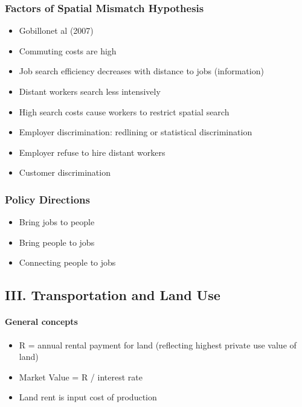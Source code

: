 \documentclass[]{article}
\providecommand{\tightlist}{%
  \setlength{\itemsep}{0pt}\setlength{\parskip}{0pt}}
\let\oldparagraph\paragraph
\renewcommand{\paragraph}[1]{\oldparagraph{#1}\mbox{}}
\begin{document}
\hypertarget{factors-of-spatial-mismatch-hypothesis}{%
\subsubsection{Factors of Spatial Mismatch
Hypothesis}\label{factors-of-spatial-mismatch-hypothesis}}

\begin{itemize}
\tightlist
\item
  Gobillonet al (2007)
\item
  Commuting costs are high
\item
  Job search efficiency decreases with distance to jobs (information)
\item
  Distant workers search less intensively
\item
  High search costs cause workers to restrict spatial search
\item
  Employer discrimination: redlining or statistical discrimination
\item
  Employer refuse to hire distant workers
\item
  Customer discrimination
\end{itemize}

\hypertarget{policy-directions}{%
\subsubsection{Policy Directions}\label{policy-directions}}

\begin{itemize}
\tightlist
\item
  Bring jobs to people
\item
  Bring people to jobs
\item
  Connecting people to jobs
\end{itemize}

\hypertarget{iii.-transportation-and-land-use}{%
\subsection{III. Transportation and Land
Use}\label{iii.-transportation-and-land-use}}

\hypertarget{general-concepts}{%
\paragraph{General concepts}\label{general-concepts}}

\begin{itemize}
\tightlist
\item
  R = annual rental payment for land (reflecting highest private use
  value of land)
\item
  Market Value = R / interest rate
\item
  Land rent is input cost of production
\end{itemize}
\end{document}
